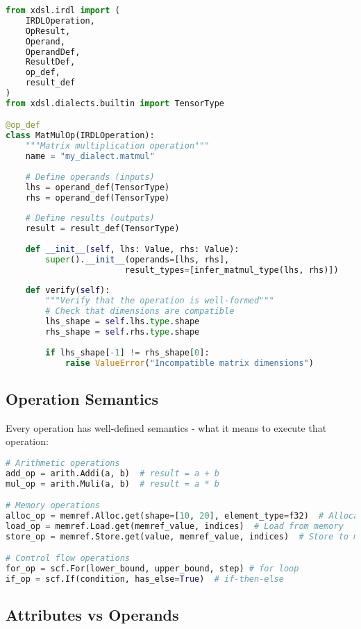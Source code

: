 \documentclass[11pt,a4paper]{article}
\begin{document}
\begin{lstlisting}[language=Python, caption=Defining Custom Operations]
from xdsl.irdl import (
    IRDLOperation, 
    OpResult, 
    Operand, 
    OperandDef, 
    ResultDef,
    op_def,
    result_def
)
from xdsl.dialects.builtin import TensorType

@op_def
class MatMulOp(IRDLOperation):
    """Matrix multiplication operation"""
    name = "my_dialect.matmul"
    
    # Define operands (inputs)
    lhs = operand_def(TensorType)
    rhs = operand_def(TensorType)
    
    # Define results (outputs)
    result = result_def(TensorType)
    
    def __init__(self, lhs: Value, rhs: Value):
        super().__init__(operands=[lhs, rhs], 
                        result_types=[infer_matmul_type(lhs, rhs)])
    
    def verify(self):
        """Verify that the operation is well-formed"""
        # Check that dimensions are compatible
        lhs_shape = self.lhs.type.shape
        rhs_shape = self.rhs.type.shape
        
        if lhs_shape[-1] != rhs_shape[0]:
            raise ValueError("Incompatible matrix dimensions")
\end{lstlisting}

\subsection{Operation Semantics}

Every operation has well-defined semantics - what it means to execute that operation:

\begin{lstlisting}[language=Python, caption=Operation Semantics Example]
# Arithmetic operations
add_op = arith.Addi(a, b)  # result = a + b
mul_op = arith.Muli(a, b)  # result = a * b

# Memory operations  
alloc_op = memref.Alloc.get(shape=[10, 20], element_type=f32)  # Allocate 10x20 array
load_op = memref.Load.get(memref_value, indices)  # Load from memory
store_op = memref.Store.get(value, memref_value, indices)  # Store to memory

# Control flow operations
for_op = scf.For(lower_bound, upper_bound, step) # for loop
if_op = scf.If(condition, has_else=True)  # if-then-else
\end{lstlisting}

\subsection{Attributes vs Operands}
\end{document}
